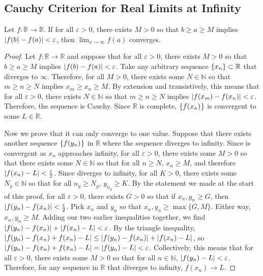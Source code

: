 \documentclass[11pt]{article}
\begin{document}
    \subsection{Cauchy Criterion for Real Limits at Infinity}
        \label{thm:6}
        Let $f: \mathbb{R} \to \mathbb{R}$.
        If for all $\varepsilon > 0$, there exists $M > 0$ so that $b \geq a \geq M$ implies $\abs{f(b) - f(a)} < \varepsilon$, then $\lim_{x \to \infty} f(a)$ converges.
        \begin{proof}
            Let $f: \mathbb{R} \to \mathbb{R}$ and suppose that for all $\varepsilon > 0$, there exists $M > 0$ so that $b \geq a \geq M$ implies $\abs{f(b) - f(a)} < \varepsilon$.
            Take any arbitrary sequence $\seq{x} \subset \mathbb{R}$ that diverges to $\infty$.
            Therefore, for all $M > 0$, there exists some $N \in \mathbb{N}$ so that $m \geq n \geq N$ implies $x_m \geq x_n \geq M$.
            By extension and transistively, this means that for all $\varepsilon > 0$, there exists $N \in \mathbb{N}$ so that $m \geq n \geq N$ implies $\abs{f(x_m) - f(x_n)} < \varepsilon$.
            Therefore, the sequence  is Cauchy.
            Since $\mathbb{R}$ is complete, $\seq[]{f(x_n)}$ is convergent to some $L \in \mathbb{R}$.

            Now we prove that it can only converge to one value.
            Suppose that there exists another sequence $\seq[]{f(y_n)}$ in $\mathbb{R}$ where the sequence  diverges to infinity.
            Since  is convergent as $x_n$ approaches infinity, for all $\varepsilon > 0$, there exists some $M > 0$ so that there exists some $N \in \mathbb{N}$ so that for all $n \geq N$, $x_n \geq M$, and therefore $\abs{f(x_n) - L} < \frac{\varepsilon}{2}$.
            Since  diverges to infinity, for all $K > 0$, there exists some $N_y \in \mathbb{N}$ so that for all $n_y \geq N_y$, $y_{n_y} \geq K$.
            By the statement we made at the start of this proof, for all $\varepsilon > 0$, there exists $G > 0$ so that if $x_n, y_n \geq G$, then $\abs{f(y_n) - f(x_n)} < \frac{\varepsilon}{2}$.
            Pick $x_n$ and $y_n$ so that $x_n, y_n \geq \max\{G,M\}$.
            Either way, $x_n, y_n \geq M$.
            Adding our two earlier inequalities together, we find $\abs{f(y_n) - f(x_n)} + \abs{f(x_n) - L} < \varepsilon$.
            By the triangle inequality, $\abs{f(y_n) - f(x_n) + f(x_n) - L} \leq \abs{f(y_n) - f(x_n)} + \abs{f(x_n) - L}$, so $\abs{f(y_n) - f(x_n) + f(x_n) - L} = \abs{f(y_n) - L} < \varepsilon$.
            Collectively, this means that for all $\varepsilon > 0$, there exists some $M > 0$ so that for all $n \in \mathbb{N}$, $\abs{f(y_n) - L} < \varepsilon$.
            Therefore, for any sequence  in $\mathbb{R}$ that diverges to infinity, $f(x_n) \to L$.
        \end{proof}
\end{document}
